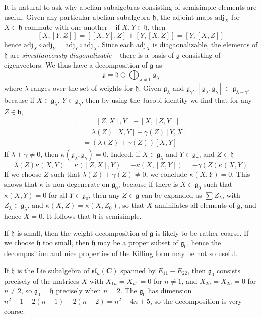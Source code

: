 It is natural to ask why abelian subalgebras consisting of semisimple elements are useful. Given any particular abelian subalgebra $\mathfrak{h}$, the adjoint maps $\text{adj}_X$ for $X \in \mathfrak{h}$ commute with one another -- if $X,Y \in \mathfrak{h}$, then
%
\[ [X,[Y,Z]] = [[X,Y],Z] + [Y,[X,Z]] = [Y,[X,Z]] \]
%
hence $\text{adj}_X \circ \text{adj}_Y = \text{adj}_Y \circ \text{adj}_X$. Since each $\text{adj}_X$ is diagaonalizable, the elements of $\mathfrak{h}$ are {\it simultaneously diagonalizable} -- there is a basis of $\mathfrak{g}$ consisting of eigenvectors. We thus have a decomposition of $\mathfrak{g}$ as
%
\[ \mathfrak{g} = \mathfrak{h} \oplus \bigoplus_{\lambda \neq 0} \mathfrak{g}_\lambda \]
%
where $\lambda$ ranges over the set of weights for $\mathfrak{h}$. Given $\mathfrak{g}_\lambda$ and $\mathfrak{g}_\gamma$, $[\mathfrak{g}_\lambda, \mathfrak{g}_\gamma] \subset \mathfrak{g}_{\lambda + \gamma}$, because if $X \in \mathfrak{g}_\lambda$, $Y \in \mathfrak{g}_\gamma$, then by using the Jacobi identity we find that for any $Z \in \mathfrak{h}$,
%
\begin{align*}
    [Z,[X,Y]] &= [[Z,X],Y] + [X,[Z,Y]]\\
    &= \lambda(Z)[X,Y] - \gamma(Z)[Y,X]\\
    &= (\lambda(Z) + \gamma(Z))[X,Y]
\end{align*}
%
If $\lambda + \gamma \neq 0$, then $\kappa(\mathfrak{g}_\lambda, \mathfrak{g}_\gamma) = 0$. Indeed, if $X \in \mathfrak{g}_\lambda$ and $Y \in \mathfrak{g}_\gamma$, and $Z \in \mathfrak{h}$
%
\[ \lambda(Z) \kappa(X,Y) = \kappa([Z,X],Y) = - \kappa(X,[Z,Y]) = -\gamma(Z) \kappa(X,Y) \]
%
If we choose $Z$ such that $\lambda(Z) + \gamma(Z) \neq 0$, we conclude $\kappa(X,Y) = 0$. This shows that $\kappa$ is non-degenerate on $\mathfrak{g}_0$, because if there is $X \in \mathfrak{g}_0$ such that $\kappa(X,Y) = 0$ for all $Y \in \mathfrak{g}_0$, then any $Z \in \mathfrak{g}$ can be expanded as $\sum Z_\lambda$, with $Z_\lambda \in \mathfrak{g}_\lambda$, and $\kappa(X,Z) = \kappa(X,Z_0)$, so that $X$ annihilates all elements of $\mathfrak{g}$, and hence $X = 0$. It follows that $\mathfrak{h}$ is semisimple.

If $\mathfrak{h}$ is small, then the weight decomposition of $\mathfrak{g}$ is likely to be rather coarse. If we choose $\mathfrak{h}$ too small, then $\mathfrak{h}$ may be a proper subset of $\mathfrak{g}_0$, hence the decomposition and nice properties of the Killing form may be not so useful.

\begin{example}
    If $\mathfrak{h}$ is the Lie subalgebra of $\mathfrak{sl}_n(\mathbf{C})$ spanned by $E_{11} - E_{22}$, then $\mathfrak{g}_0$ consists precisely of the matrices $X$ with $X_{1n} = X_{n1} = 0$ for $n \neq 1$, and $X_{2n} = X_{2n} = 0$ for $n \neq 2$, so $\mathfrak{g}_0 = \mathfrak{h}$ precisely when $n = 2$. The $\mathfrak{g}_0$ has dimension $n^2 - 1 - 2(n-1) - 2(n-2) = n^2 - 4n + 5$, so the decomposition is very coarse.
\end{example}


